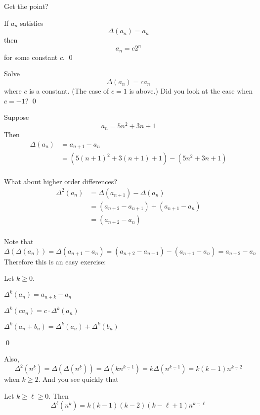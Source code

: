 Get the point?

\begin{thm}
  If $a_n$ satisfies
  \[
  \Delta ( a_n ) = a_n
  \]
  then
  \[
  a_n = c 2^n
  \]
  for some constant $c$.
  \qed
\end{thm}

\begin{ex}
  Solve
  \[
  \Delta( a_n ) = c a_n
  \]
  where $c$ is a constant. (The case of $c = 1$ is above.)
  Did you look at the case when $c = -1$?
  \qed
\end{ex}
  
Suppose
\[
a_n = 5n^2 + 3n + 1
\]
Then
\begin{align*}
\Delta (a_n)
&= a_{n+1} - a_n \\
&= (5(n+1)^2 + 3(n+1) + 1) - (5n^2 + 3n + 1) \\
\end{align*}

What about higher order differences?
\begin{align*}
\Delta^2(a_n)
&= \Delta(a_{n+1}) - \Delta(a_{n}) \\
&= (a_{n+2} - a_{n+1}) +  (a_{n+1} - a_{n})\\
&= (a_{n+2} - a_{n})\\
\end{align*}

Note that
\[
\Delta( \Delta (a_n) )
= \Delta( a_{n+1} - a_n )
= (a_{n+2} - a_{n+1}) - (a_{n+1} - a_n)
= a_{n+2} - a_n
\]
Therefore this is an easy exercise:
\begin{thm} Let $k \geq 0$.
  \begin{tightlist}
    \item $\Delta^k(a_n) = a_{n+k} - a_n$
    \item $\Delta^k(c a_n) = c \cdot \Delta^k( a_n )$
    \item $\Delta^k(a_n + b_n) = \Delta^k( a_n ) + \Delta^k( b_n )$
  \end{tightlist}
  \qed
\end{thm}

Also,
\[
\Delta^2( n^{\underline{k}} )
= \Delta( \Delta( n^{\underline{k}} ) )
= \Delta( k n^{\underline{k - 1}} )
= k \Delta( n^{\underline{k - 1}} )
= k (k-1) n^{\underline{k - 2}}
\]
when $k \geq 2$.
And you see quickly that

\begin{thm} Let $k \geq \ell \geq 0$. Then
\[
\Delta^{\ell} ( n^{\underline{k}} )
= k (k-1) (k-2) (k - \ell + 1) n^{ \underline{k - \ell} }
\]
\end{thm}

